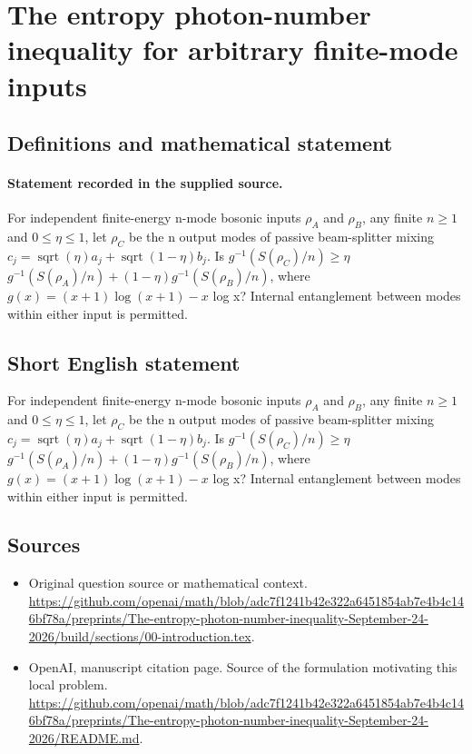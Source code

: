\documentclass[11pt]{article}
\begin{document}
\section*{The entropy photon-number inequality for arbitrary finite-mode inputs}\label{statement}
\subsection{Definitions and mathematical statement}
\paragraph{Statement recorded in the supplied source.}
For independent finite-energy n-mode bosonic inputs $\rho _A$ and $\rho _B$, any finite $n\geq 1$ and $0\leq \eta \leq 1$, let $\rho _C$ be the n output modes of passive beam-splitter mixing $c_j=\operatorname{sqrt}(\eta )a_j+\operatorname{sqrt}(1-\eta )b_j$. Is $g^{-1}(S(\rho _C)/n)\geq \eta $ $g^{-1}(S(\rho _A)/n)+(1-\eta )g^{-1}(S(\rho _B)/n)$, where $g(x)=(x+1)\log (x+1)-x$ log x? Internal entanglement between modes within either input is permitted.
\subsection{Short English statement}
For independent finite-energy n-mode bosonic inputs $\rho _A$ and $\rho _B$, any finite $n\geq 1$ and $0\leq \eta \leq 1$, let $\rho _C$ be the n output modes of passive beam-splitter mixing $c_j=\operatorname{sqrt}(\eta )a_j+\operatorname{sqrt}(1-\eta )b_j$. Is $g^{-1}(S(\rho _C)/n)\geq \eta $ $g^{-1}(S(\rho _A)/n)+(1-\eta )g^{-1}(S(\rho _B)/n)$, where $g(x)=(x+1)\log (x+1)-x$ log x? Internal entanglement between modes within either input is permitted.
\subsection{Sources}
\begin{itemize}
\item[S1] Original question source or mathematical context.
\url{https://github.com/openai/math/blob/adc7f1241b42e322a6451854ab7e4b4c146bf78a/preprints/The-entropy-photon-number-inequality-September-24-2026/build/sections/00-introduction.tex}.
\item[S2] OpenAI, manuscript citation page. Source of the formulation motivating this local problem.
\url{https://github.com/openai/math/blob/adc7f1241b42e322a6451854ab7e4b4c146bf78a/preprints/The-entropy-photon-number-inequality-September-24-2026/README.md}.
\end{itemize}
\end{document}
